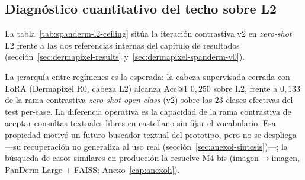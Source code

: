 \subsection{Diagnóstico cuantitativo del techo sobre L2}
\label{sec:anexoi-l2-ceiling}

La tabla~\ref{tab:spanderm-l2-ceiling} sitúa la iteración contrastiva
v2 en \emph{zero-shot} L2 frente a las dos referencias internas del
capítulo de resultados (sección~\ref{sec:dermapixel-results}
y~\ref{sec:dermapixel-spanderm-v0}).

\begin{table}[H]
\centering
\footnotesize
\setlength{\tabcolsep}{4pt}
\renewcommand{\arraystretch}{0.95}
\caption{Rama contrastiva de Dermapixel R0 \emph{zero-shot} L2
frente a las dos
referencias internas del capítulo sobre el mismo nivel ontológico.
Las tres referencias evalúan sobre el conjunto de test de
DermapixelAI~1.0; la cifra de la iteración v2 corresponde al
test de $101$ imágenes del \emph{split} per-case del experimento
contrastivo y las dos restantes al test fijo
$N_{\mathrm{test}} = 36$ de la sección~\ref{sec:dermapixel-results}.
La comparación es indicativa por la diferencia muestral.}
\label{tab:spanderm-l2-ceiling}
\end{table}

La jerarquía entre regímenes es la esperada: la cabeza supervisada
cerrada con LoRA (Dermapixel R0, cabeza L2) alcanza Acc@1 $0{,}250$
sobre L2, frente a $0{,}133$ de la rama contrastiva \emph{zero-shot
open-class} (v2) sobre las $23$ clases efectivas del test per-case. La
diferencia operativa es la capacidad de la rama contrastiva de aceptar
consultas textuales libres en castellano sin fijar el vocabulario. Esa
propiedad motivó un futuro buscador textual del prototipo, pero no se
despliega ---su recuperación no generaliza al uso real
(sección~\ref{sec:anexoi-sintesis})---; la búsqueda de casos similares en
producción la resuelve M4-bis (imagen$\to$imagen, PanDerm Large $+$ FAISS;
Anexo~\ref{cap:anexoh}).

